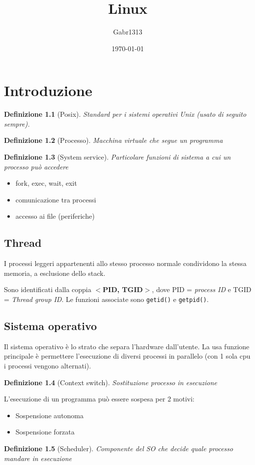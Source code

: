 \documentclass[12pt, a4paper]{report}
\title{Linux}
\author{Gabr1313}
\date{\today}
\newtheorem{definition}{Definizione}
\begin{document}
\justify

\maketitle
\tableofcontents

\chapter{Introduzione}
\begin{definition}[Posix]
	Standard per i sistemi operativi Unix (usato di seguito sempre).
\end{definition}
\begin{definition}[Processo]
	Macchina virtuale che segue un programma
\end{definition}
\begin{definition}[System service] Particolare funzioni di sistema a cui un
	processo può accedere
\end{definition}
\begin{itemize}
	\item fork, exec, wait, exit
	\item comunicazione tra processi
	\item accesso ai file (periferiche)
\end{itemize}
\section{Thread}
I processi leggeri appartenenti allo stesso processo normale condividono la
stessa memoria, a esclusione dello stack.

Sono identificati dalla coppia \textbf{$<$PID, TGID$>$}, dove PID =
\textit{process ID} e TGID = \textit{Thread group ID}. Le funzioni associate
sono \texttt{getid()} e \texttt{getpid()}.

\section{Sistema operativo}
Il sistema operativo è lo strato che separa l'hardware dall'utente. La usa
funzione principale è permettere l'esecuzione di diversi processi in parallelo
(con 1 sola cpu i processi vengono alternati).
\begin{definition}[Context switch]
	Sostituzione processo in esecuzione
\end{definition}
L'esecuzione di un programma può essere sospesa per 2 motivi:
\begin{itemize}
	\item Sospensione autonoma
	\item Sospensione forzata
\end{itemize}
\begin{definition}[Scheduler]
	Componente del SO che decide quale processo mandare in esecuzione
\end{definition}
\end{document}
